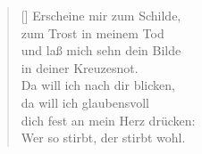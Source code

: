 \begin{multicols}{2}
\begin{verse}[\versewidth]
 Erscheine mir zum Schilde,\\
zum Trost in meinem Tod\\
und laß mich sehn dein Bilde\\
in deiner Kreuzesnot.\\
Da will ich nach dir blicken,\\
da will ich glaubensvoll\\
dich fest an mein Herz drücken:\\
Wer so stirbt, der stirbt wohl.
      
\end{verse}
\end{multicols}
